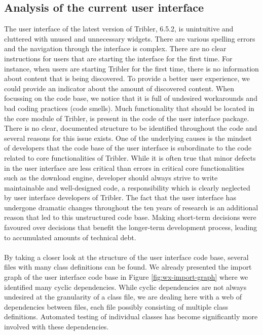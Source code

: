 \subsection{Analysis of the current user interface}
The user interface of the latest version of Tribler, 6.5.2, is unintuitive and cluttered with unused and unnecessary widgets. There are various spelling errors and the navigation through the interface is complex. There are no clear instructions for users that are starting the interface for the first time. For instance, when users are starting Tribler for the first time, there is no information about content that is being discovered. To provide a better user experience, we could provide an indicator about the amount of discovered content.
When focussing on the code base, we notice that it is full of undesired workarounds and bad coding practices (code smells). Much functionality that should be located in the core module of Tribler, is present in the code of the user interface package. There is no clear, documented structure to be identified throughout the code and several reasons for this issue exists. One of the underlying causes is the mindset of developers that the code base of the user interface is subordinate to the code related to core functionalities of Tribler. While it is often true that minor defects in the user interface are less critical than errors in critical core functionalities such as the download engine, developer should always strive to write maintainable and well-designed code, a responsibility which is clearly neglected by user interface developers of Tribler. The fact that the user interface has undergone dramatic changes throughout the ten years of research is an additional reason that led to this unstructured code base. Making short-term decisions were favoured over decisions that benefit the longer-term development process, leading to accumulated amounts of technical debt.\\\\
By taking a closer look at the structure of the user interface code base, several files with many class definitions can be found. We already presented the import graph of the user interface code base in Figure \ref{fig:wx-import-graph} where we identified many cyclic dependencies. While cyclic dependencies are not always undesired at the granularity of a class file, we are dealing here with a web of dependencies between files, each file possibly consisting of multiple class definitions. Automated testing of individual classes has become significantly more involved with these dependencies.\\\\
